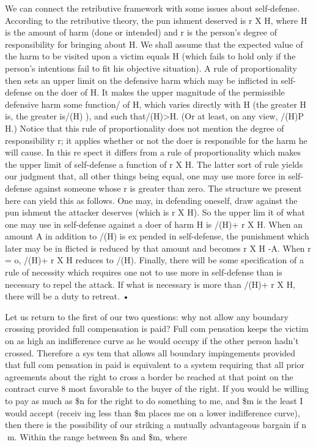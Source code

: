 \documentclass[11pt,openany]{book}
\begin{document}
We can connect the retributive framework with some issues about self-defense. According to the retributive theory, the pun ishment deserved is r X H, where H is the amount of harm (done or intended) and r is the person's degree of responsibility for bringing about H. We shall assume that the expected value of the harm to be visited upon a victim equals H (which fails to hold only if the person's intentions fail to fit his objective situation). A rule of proportionality then sets an upper limit on the defensive harm which may be inflicted in self-defense on the doer of H. It makes the upper magnitude of the permissible defensive harm some function/ of H, which varies directly with H (the greater H is, the greater is/(H) ), and such that/(H)>H. (Or at least, on any view, /(H)P H.) Notice that this rule of proportionality does not mention the degree of responsibility r; it applies whether or not the doer is responsible for the harm he will cause. In this re spect it differs from a rule of proportionality which makes the upper limit of self-defense a function of r X H. The latter sort of rule yields our judgment that, all other things being equal, one may use more force in self-defense against someone whose r is greater than zero. The structure we present here can yield this as follows. One may, in defending oneself, draw against the pun ishment the attacker deserves (which is r X H). So the upper lim it of what one may use in self-defense against a doer of harm H is /(H)+ r X H. When an amount A in addition to /(H) is ex pended in self-defense, the punishment which later may be in flicted is reduced by that amount and becomes r X H -A. When r = o, /(H)+ r X H reduces to /(H). Finally, there will be some specification of a rule of necessity which requires one not to use more in self-defense than is necessary to repel the attack. If what is necessary is more than /(H)+ r X H, there will be a duty to retreat. • 

Let us return to the first of our two questions: why not allow any boundary crossing provided full compensation is paid? Full com pensation keeps the victim on as high an indifference curve as he would occupy if the other person hadn't crossed. Therefore a sys tem that allows all boundary impingements provided that full com pensation in paid is equivalent to a system requiring that all prior agreements about the right to cross a border be reached at that point on the contract curve 8 most favorable to the buyer of the right. If you would be willing to pay as much as \$n for the right to do something to me, and \$m is the least I would accept (receiv ing less than \$m places me on a lower indifference curve), then there is the possibility of our striking a mutually advantageous bargain if n m. Within the range between \$n and \$m, where 
\end{document}
